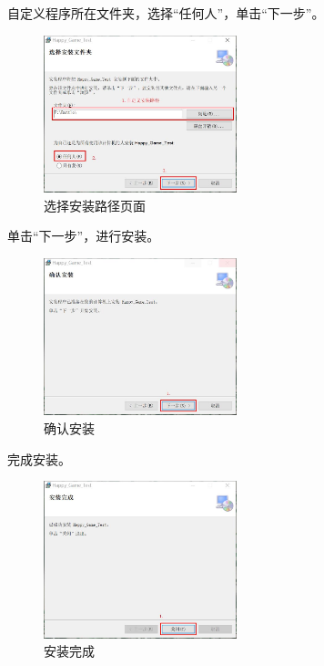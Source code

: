 \par
自定义程序所在文件夹，选择“任何人”，单击“下一步”。
\par
\begin{figure}[htbp]
    \vspace{13pt} %
    \centering
    \includegraphics[width=0.5\textwidth]{images/4-3.jpg}
    \caption{选择安装路径页面}%
\end{figure}
\par
单击“下一步”，进行安装。
\par
\begin{figure}[htbp]
    \vspace{13pt} %
    \centering
    \includegraphics[width=0.5\textwidth]{images/4-4.jpg}
    \caption{确认安装}%
\end{figure}
\par
完成安装。
\par
\begin{figure}[htbp]
    \vspace{13pt} %
    \centering
    \includegraphics[width=0.5\textwidth]{images/4-5.jpg}
    \caption{安装完成}%
\end{figure}
